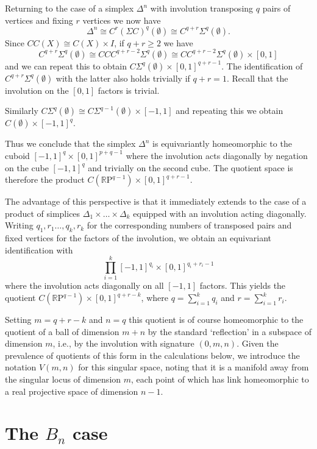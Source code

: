 \documentclass[11pt,a4paper]{article}
\def\R{\mathbb{R}}
\def\RP{\R\mathrm{P}}
\begin{document}
\bigskip

Returning to the case of a simplex $\Delta^n$ with involution transposing $q$ pairs of vertices and fixing $r$ vertices we now have
\[
\Delta^n \cong C^r(\Sigma C)^q(\emptyset)\cong C^{q+r}\Sigma^q(\emptyset).
\]
Since $CC(X)\cong C(X)\times I$, if $q+r\geq 2$ we have 
\[
C^{q+r}\Sigma^q(\emptyset)\cong CCC^{q+r-2}\Sigma^q(\emptyset)\cong CC^{q+r-2}\Sigma^q(\emptyset)\times [0,1]
\]
and we can repeat this to obtain $C\Sigma^q(\emptyset)\times [0,1]^{q+r-1}$.  The identification of $C^{q+r}\Sigma^q(\emptyset)$ with the latter also holds trivially if $q+r=1$. Recall that the involution on the $[0,1]$ factors is trivial.

Similarly $C\Sigma^q(\emptyset)\cong C\Sigma^{q-1}(\emptyset)\times [-1,1]$ and repeating this we obtain $C(\emptyset)\times [-1,1]^q$.

Thus we conclude that the simplex $\Delta^n$ is equivariantly homeomorphic to the cuboid $[-1,1]^q\times [0,1]^{p+q-1}$ where the involution acts diagonally by negation on the cube $[-1,1]^q$ and trivially on the second cube. The quotient space is therefore the product $C(\RP^{q-1})\times [0,1]^{q+r-1}$.

The advantage of this perspective is that it immediately extends to the case of a product of simplices $\Delta_1\times\dots\times \Delta_k$ equipped with an involution acting diagonally. Writing $q_1,r_1\dots, q_k,r_k$ for the corresponding numbers of transposed pairs and fixed vertices for the factors of the involution, we obtain an equivariant identification with 
\[
\prod_{i=1}^k [-1,1]^{q_i}\times [0,1]^{q_i+r_i-1}
\]
where the involution acts diagonally on all $[-1,1]$ factors.  This yields the quotient $C(\RP^{q-1})\times [0,1]^{q+r-k}$, where $q=\sum\limits_{i=1}^k q_i$ and $r=\sum\limits_{i=1}^k r_i$.

Setting $m=q+r-k$ and $n=q$ this quotient is of course homeomorphic to the quotient of a ball of dimension $m+n$ by the standard `reflection' in a subspace of dimension $m$, i.e., by the involution with signature $(0, m,n)$. Given the prevalence of quotients of this form in the calculations below, we introduce the notation $V(m,n)$ for this singular space, noting that it is a manifold away from the singular locus of dimension $m$, each point of which has link homeomorphic to a real projective space of dimension $n-1$.





\section{The $B_{n}$ case}\label{B_n case}
\end{document}
